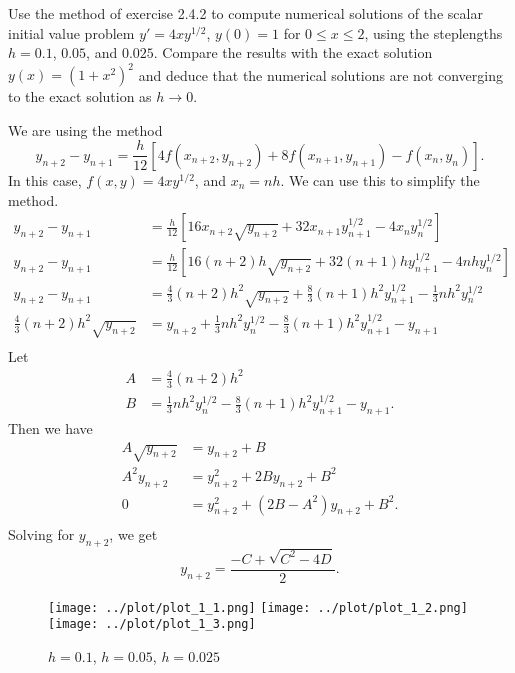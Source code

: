 \begin{problem}[L 2.4.2]
  Use the method of exercise 2.4.2 to compute numerical solutions of the scalar initial value problem $y' = 4xy^{1/2}$, $y(0) = 1$ for $0 \leq x \leq 2$, using the steplengths $h = 0.1$, $0.05$, and $0.025$. Compare the results with the exact solution $y(x) = (1 + x^2)^2$ and deduce that the numerical solutions are not converging to the exact solution as $h \to 0$.
\end{problem}

\begin{solution}
  We are using the method
  \[
    y_{n + 2} - y_{n + 1} = \frac{h}{12}\left[4 f(x_{n + 2}, y_{n + 2}) + 8 f(x_{n + 1}, y_{n + 1}) - f(x_n, y_n)\right].
  \]
  In this case, $f(x, y) = 4xy^{1/2}$, and $x_n = nh$. We can use this to simplify the method.
  \begin{align*}
    y_{n + 2} - y_{n + 1} &= \frac{h}{12}\left[16 x_{n + 2} \sqrt{y_{n + 2}} + 32 x_{n + 1} y_{n + 1}^{1/2} - 4 x_n y_n^{1/2}\right] \\
    y_{n + 2} - y_{n + 1} &= \frac{h}{12}\left[16 (n + 2) h \sqrt{y_{n + 2}} + 32 (n + 1) h y_{n + 1}^{1/2} - 4 n h y_n^{1/2}\right] \\
    y_{n + 2} - y_{n + 1} &= \frac{4}{3} (n + 2) h^2 \sqrt{y_{n + 2}} + \frac{8}{3} (n + 1) h^2 y_{n + 1}^{1/2} - \frac{1}{3} n h^2 y_n^{1/2} \\
    \frac{4}{3} (n + 2) h^2 \sqrt{y_{n + 2}} &= y_{n + 2} + \frac{1}{3} n h^2 y_n^{1/2} - \frac{8}{3} (n + 1) h^2 y_{n + 1}^{1/2} - y_{n + 1} \\
  \end{align*}
  Let
  \begin{align*}
    A &= \frac{4}{3} (n + 2) h^2 \\
    B &= \frac{1}{3} n h^2 y_n^{1/2} - \frac{8}{3} (n + 1) h^2 y_{n + 1}^{1/2} - y_{n + 1}.
  \end{align*}
  Then we have
  \begin{align*}
    A \sqrt{y_{n + 2}} &= y_{n + 2} + B \\
    A^2 y_{n + 2} &= y_{n + 2}^2 + 2 B y_{n + 2} + B^2 \\
    0 &= y_{n+2}^2 + (2B - A^2)y_{n+2} + B^2. \\
  \end{align*}
  Solving for $y_{n + 2}$, we get
  \[
    y_{n + 2} = \frac{-C + \sqrt{C^2 - 4D}}{2}.
  \]
  
  \begin{figure}[!ht]
    \centering
    \texttt{[image: ../plot/plot\_1\_1.png]}
    \texttt{[image: ../plot/plot\_1\_2.png]}
    \texttt{[image: ../plot/plot\_1\_3.png]}
    \caption{$h = 0.1$, $h = 0.05$, $h = 0.025$}
    \label{fig:prob1}
  \end{figure}
\end{solution}
